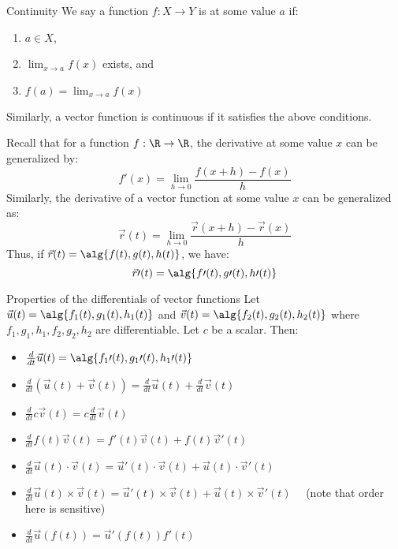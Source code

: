 \documentclass[12pt]{report}
\begin{document}
\begin{dfnbox}{Continuity}{}
    We say a function $f : X \to Y$ is  at some value $a$ if:
    \begin{enumerate}[noitemsep]
        \item $a \in X$,
        \item $\lim_{x \to a} f(x)$ exists, and
        \item $f(a) = \lim_{x \to a} f(x)$
    \end{enumerate}
\end{dfnbox}

Similarly, a vector function is continuous if it satisfies the above conditions.

Recall that for a function $f : \R \to \R$, the derivative at some value $x$ can be generalized by:
\[ f\prime(x) = \lim_{h \to 0} \frac{f(x + h) - f(x)}{h} \]
Similarly, the derivative of a vector function at some value $x$ can be generalized as:
\[ \vec{r}(t) = \lim_{h \to 0} \frac{\vec{r}(x+h) - \vec{r}(x)}{h} \]
Thus, if $\vec{r}(t) = \alg{f(t), g(t), h(t)}$, we have:
\[ \vec{r}\prime(t) = \alg{f\prime(t), g\prime(t), h\prime(t)} \]

\begin{thmbox}{Properties of the differentials of vector functions}{}
    Let $\vec{u}(t) = \alg{f_1(t), g_1(t), h_1(t)}$ and $\vec{v}(t) = \alg{f_2(t), g_2(t), h_2(t) }$ where $f_1, g_1, h_1, f_2, g_2, h_2$ are differentiable. Let $c$ be a scalar. Then:
    \begin{itemize}
        \item $\frac{d}{dt} \vec{u}(t) = \alg{f_1\prime(t), g_1\prime(t), h_1\prime(t)}$
        \item $\frac{d}{dt} \left( \vec{u}(t) + \vec{v}(t) \right) = \frac{d}{dt} \vec{u}(t) + \frac{d}{dt} \vec{v}(t)$
        \item $\frac{d}{dt} c \vec{v}(t) = c \frac{d}{dt} \vec{v}(t)$
        \item $\frac{d}{dt} f(t) \vec{v}(t) = f\prime(t) \vec{v}(t) + f(t) \vec{v}\prime(t)$
        \item $\frac{d}{dt} \vec{u}(t) \cdot \vec{v}(t) = \vec{u}\prime(t) \cdot \vec{v}(t) + \vec{u}(t) \cdot \vec{v}\prime(t)$
        \item $\frac{d}{dt} \vec{u}(t) \times \vec{v}(t) = \vec{u}\prime(t) \times \vec{v}(t) + \vec{u}(t) \times \vec{v}\prime(t) \quad$ (note that order here is sensitive)
        \item $\frac{d}{dt} \vec{u}(f(t)) = \vec{u}\prime(f(t)) f\prime(t)$
    \end{itemize}
\end{thmbox}
\end{document}

